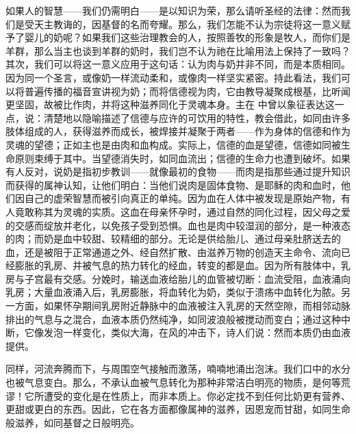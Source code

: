 如果人的智慧——我们仍需明白——是以知识为荣，那么请听圣经的法律：然而我们是受天主教诲的，因基督的名而夸耀。那么，我们怎能不认为宗徒将这一意义赋予了婴儿的奶呢？如果我们这些治理教会的人，按照善牧的形象是牧人，而你们是羊群，那么当主也谈到羊群的奶时，我们岂不认为祂在比喻用法上保持了一致吗？其次，我们可以将这一意义应用于这句话：认为肉与奶并非不同，而是本质相同。因为同一个圣言，或像奶一样流动柔和，或像肉一样坚实紧密。持此看法，我们可以将普遍传播的福音宣讲视为奶；而将信德视为肉，它由教导凝聚成根基，比听闻更坚固，故被比作肉，并将这种滋养同化于灵魂本身。主在  中曾以象征表达这一点，说：清楚地以隐喻描述了信德与应许的可饮用的特性，教会借此，如同由许多肢体组成的人，获得滋养而成长，被焊接并凝聚于两者——作为身体的信德和作为灵魂的望德；正如主也是由肉和血构成。实际上，信德的血是望德，信德如同被生命原则束缚于其中。当望德消失时，如同血流出；信德的生命力也遭到破坏。如果有人反对，说奶是指初步教训——就像最初的食物——而肉是指那些通过提升知识而获得的属神认知，让他们明白：当他们说肉是固体食物、是耶稣的肉和血时，他们因自己的虚荣智慧而被引向真正的单纯。因为血在人体中被发现是原始产物，有人竟敢称其为灵魂的实质。这血在母亲怀孕时，通过自然的同化过程，因父母之爱的交感而绽放并老化，以免孩子受到恐惧。血也是肉中较湿润的部分，是一种液态的肉；而奶是血中较甜、较精细的部分。无论是供给胎儿、通过母亲肚脐送去的血，还是被阻于正常通道之外、经自然扩散、由滋养万物的创造天主命令、流向已经膨胀的乳房、并被气息的热力转化的经血，转变的都是血。因为所有肢体中，乳房与子宫最有交感。分娩时，输送血液给胎儿的血管被切断：血流受阻，血液涌向乳房；大量血液涌入后，乳房膨胀，将血转化为奶，类似于溃疡中血转化为脓。另一方面，如果怀孕期间乳房附近静脉中的血液被注入乳房的天然空隙，而相邻动脉排出的气息与之混合，血液本质仍然纯净，如同波浪般被搅动而变白；通过这种中断，它像发泡一样变化，类似大海，在风的冲击下，诗人们说：然而本质仍由血液提供。\par

同样，河流奔腾而下，与周围空气接触而激荡，喃喃地涌出泡沫。我们口中的水分也被气息变白。那么，不承认血被气息转化为那种非常洁白明亮的物质，是何等荒谬！它所遭受的变化是在性质上，而非本质上。你必定找不到任何比奶更有营养、更甜或更白的东西。因此，它在各方面都像属神的滋养，因恩宠而甘甜，如同生命般滋养，如同基督之日般明亮。\par

